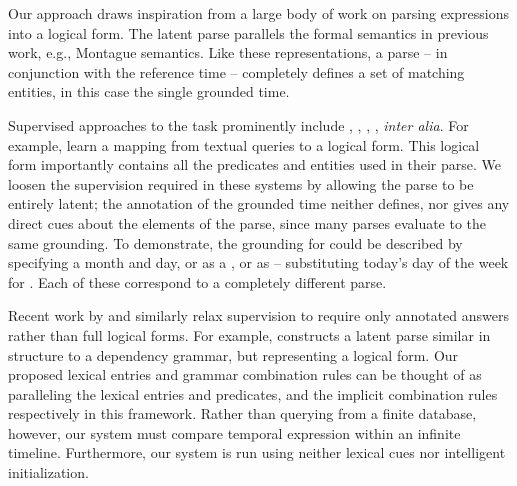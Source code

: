 Our approach draws inspiration from a large body of work
	on parsing expressions into a logical form.
The latent parse parallels the formal semantics in previous work,
	e.g., Montague semantics.
Like these representations, a parse -- in conjunction with
	the reference time -- completely defines a set of
	matching entities, in this case the single grounded time.

Supervised approaches to the task prominently include
	,
	,
	, 
	, 
	\textit{inter alia}.
For example,  learn a mapping from
	textual queries to a logical form.
This logical form importantly contains all the predicates and entities
	used in their parse.
We loosen the supervision required in these systems by allowing the parse to
	be entirely latent;
	the annotation of the grounded time neither defines, nor gives any
	direct cues about the elements of the parse, since many parses evaluate
	to the same grounding.
To demonstrate, the grounding for  could be
	described by specifying a month and day, or as a , or as  -- substituting today's day of the week for .
Each of these correspond to a completely different parse.

Recent work by  and 
	 similarly relax supervision 
	to require only annotated answers rather than full logical forms.
For example,  constructs a latent parse
	similar in structure to a dependency grammar, but representing a logical
	form.
Our proposed lexical entries and grammar combination rules can be thought of as
	paralleling the lexical entries and predicates, and the implicit combination 
	rules respectively in this framework.
Rather than querying from a finite database, however, our system must compare
	temporal expression within an infinite timeline.
Furthermore, our system is run using neither lexical cues nor intelligent
	initialization.

